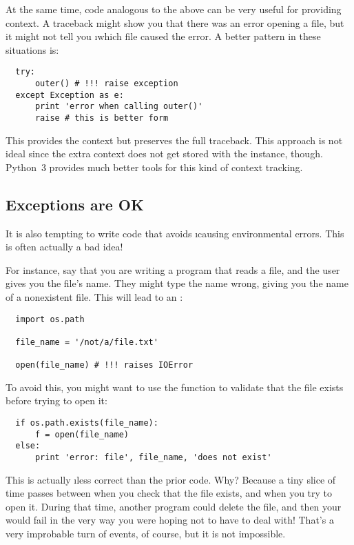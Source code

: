 \documentclass[letterpaper, 12pt, titlepage, twoside]{article}
\begin{document}
At the same time, code analogous to the above can be very useful for providing
context. A traceback might show you that there was an error opening a file,
but it might not tell you \i{which} file caused the error. A better pattern in
these situations is:

\begin{lstlisting}
  try:
      outer() # !!! raise exception
  except Exception as e:
      print 'error when calling outer()'
      raise # this is better form
\end{lstlisting}

This provides the context but preserves the full traceback. This approach is
not ideal since the extra context does not get stored with the 
instance, though. Python~3 provides much better tools for this kind of context
tracking.

\subsection*{Exceptions are OK}

It is also tempting to write code that avoids \i{causing} environmental
errors. This is often actually a bad idea!

For instance, say that you are writing a program that reads a file, and the
user gives you the file's name. They might type the name wrong, giving you the
name of a nonexistent file. This will lead to an :

\begin{lstlisting}
  import os.path

  file_name = '/not/a/file.txt'

  open(file_name) # !!! raises IOError
\end{lstlisting}

To avoid this, you might want to use the  function to
validate that the file exists before trying to open it:

\begin{lstlisting}
  if os.path.exists(file_name):
      f = open(file_name)
  else:
      print 'error: file', file_name, 'does not exist'
\end{lstlisting}

This is actually \i{less correct} than the prior code. Why? Because a tiny
slice of time passes between when you check that the file exists, and when you
try to open it. During that time, another program could delete the file, and
then your  would fail in the very way you were hoping not to have to
deal with! That's a very improbable turn of events, of course, but it is not
impossible.
\end{document}
